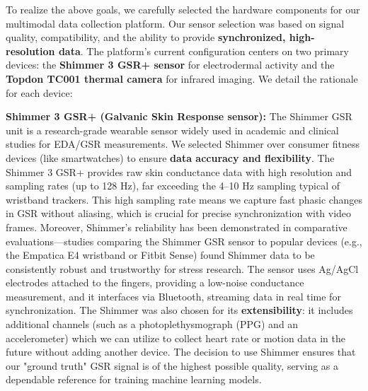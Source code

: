 To realize the above goals, we carefully selected the hardware components for our multimodal data collection platform. Our sensor selection was based on signal quality, compatibility, and the ability to provide \textbf{synchronized, high-resolution data}. The platform's current configuration centers on two primary devices: the \textbf{Shimmer 3 GSR+ sensor} for electrodermal activity and the \textbf{Topdon TC001 thermal camera} for infrared imaging. We detail the rationale for each device:

\textbf{Shimmer 3 GSR+ (Galvanic Skin Response sensor):} The Shimmer GSR unit is a research-grade wearable sensor widely used in academic and clinical studies for EDA/GSR measurements. We selected Shimmer over consumer fitness devices (like smartwatches) to ensure \textbf{data accuracy and flexibility}. The Shimmer 3 GSR+ provides raw skin conductance data with high resolution and sampling rates (up to 128 Hz)\cite{GSRPPGMachineLearning2024}, far exceeding the 4–10 Hz sampling typical of wristband trackers. This high sampling rate means we capture fast phasic changes in GSR without aliasing, which is crucial for precise synchronization with video frames. Moreover, Shimmer's reliability has been demonstrated in comparative evaluations—studies comparing the Shimmer GSR sensor to popular devices (e.g., the Empatica E4 wristband or Fitbit Sense) found Shimmer data to be consistently robust and trustworthy for stress research\cite{GSRPPGMachineLearning2024}. The sensor uses Ag/AgCl electrodes attached to the fingers, providing a low-noise conductance measurement, and it interfaces via Bluetooth, streaming data in real time for synchronization. The Shimmer was also chosen for its \textbf{extensibility}: it includes additional channels (such as a photoplethysmograph (PPG) and an accelerometer) which we can utilize to collect heart rate or motion data in the future without adding another device\cite{GSRPPGMachineLearning2024}. The decision to use Shimmer ensures that our "ground truth" GSR signal is of the highest possible quality, serving as a dependable reference for training machine learning models.

